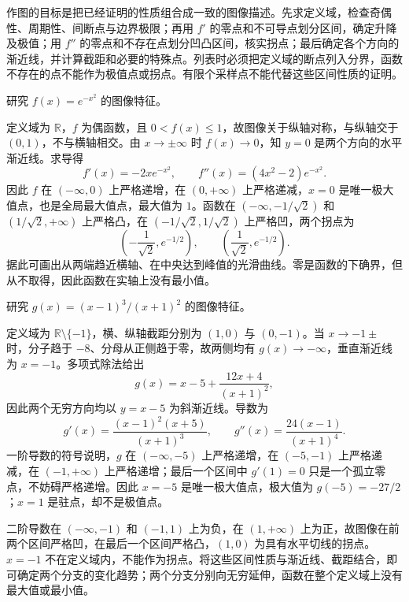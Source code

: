 \documentclass[UTF8,12pt,a4paper,fontset=fandol]{ctexbook}
\begin{document}
作图的目标是把已经证明的性质组合成一致的图像描述。先求定义域，检查奇偶性、周期性、间断点与边界极限；再用 $f'$ 的零点和不可导点划分区间，确定升降及极值；用 $f''$ 的零点和不存在点划分凹凸区间，核实拐点；最后确定各个方向的渐近线，并计算截距和必要的特殊点。列表时必须把定义域的断点列入分界，函数不存在的点不能作为极值点或拐点。有限个采样点不能代替这些区间性质的证明。

\begin{example}
\label{ex:graphing-gaussian-function}
研究 $f(x)=e^{-x^2}$ 的图像特征。
\end{example}

\begin{solve}
定义域为 $\mathbb{R}$，$f$ 为偶函数，且 $0<f(x)\leq1$，故图像关于纵轴对称，与纵轴交于 $(0,1)$，不与横轴相交。由 $x\to\pm\infty$ 时 $f(x)\to0$，知 $y=0$ 是两个方向的水平渐近线。求导得
\[
    f'(x)=-2xe^{-x^2},\qquad
    f''(x)=(4x^2-2)e^{-x^2}.
\]
因此 $f$ 在 $(-\infty,0)$ 上严格递增，在 $(0,+\infty)$ 上严格递减，$x=0$ 是唯一极大值点，也是全局最大值点，最大值为 $1$。函数在 $(-\infty,-1/\sqrt2)$ 和 $(1/\sqrt2,+\infty)$ 上严格凸，在 $(-1/\sqrt2,1/\sqrt2)$ 上严格凹，两个拐点为
\[
    \left(-\frac1{\sqrt2},e^{-1/2}\right),\qquad
    \left(\frac1{\sqrt2},e^{-1/2}\right).
\]
据此可画出从两端趋近横轴、在中央达到峰值的光滑曲线。零是函数的下确界，但从不取得，因此函数在实轴上没有最小值。
\end{solve}

\begin{example}
\label{ex:graphing-rational-function}
研究 $g(x)=(x-1)^3/(x+1)^2$ 的图像特征。
\end{example}

\begin{solve}
定义域为 $\mathbb{R}\setminus\{-1\}$，横、纵轴截距分别为 $(1,0)$ 与 $(0,-1)$。当 $x\to-1\pm$ 时，分子趋于 $-8$、分母从正侧趋于零，故两侧均有 $g(x)\to-\infty$，垂直渐近线为 $x=-1$。多项式除法给出
\[
    g(x)=x-5+\frac{12x+4}{(x+1)^2},
\]
因此两个无穷方向均以 $y=x-5$ 为斜渐近线。导数为
\[
    g'(x)=\frac{(x-1)^2(x+5)}{(x+1)^3},\qquad
    g''(x)=\frac{24(x-1)}{(x+1)^4}.
\]
一阶导数的符号说明，$g$ 在 $(-\infty,-5)$ 上严格递增，在 $(-5,-1)$ 上严格递减，在 $(-1,+\infty)$ 上严格递增；最后一个区间中 $g'(1)=0$ 只是一个孤立零点，不妨碍严格递增。因此 $x=-5$ 是唯一极大值点，极大值为 $g(-5)=-27/2$；$x=1$ 是驻点，却不是极值点。

二阶导数在 $(-\infty,-1)$ 和 $(-1,1)$ 上为负，在 $(1,+\infty)$ 上为正，故图像在前两个区间严格凹，在最后一个区间严格凸，$(1,0)$ 为具有水平切线的拐点。$x=-1$ 不在定义域内，不能作为拐点。将这些区间性质与渐近线、截距结合，即可确定两个分支的变化趋势；两个分支分别向无穷延伸，函数在整个定义域上没有最大值或最小值。
\end{solve}
\end{document}
